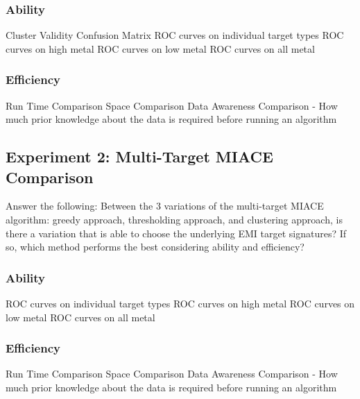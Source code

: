 \subsubsection{Ability}
Cluster Validity\newline
Confusion Matrix\newline
ROC curves on individual target types\newline
ROC curves on high metal \newline
ROC curves on low metal\newline
ROC curves on all metal

\subsubsection{Efficiency}
Run Time Comparison \newline
Space Comparison \newline
Data Awareness Comparison - How much prior knowledge about the data is required before running an algorithm\newline



\subsection{Experiment 2: Multi-Target MIACE Comparison}
Answer the following: Between the 3 variations of the multi-target MIACE algorithm: greedy approach, thresholding approach, and clustering approach, is there a variation that is able to choose the underlying EMI target signatures? If so, which method performs the best considering ability and efficiency?

\subsubsection{Ability}
ROC curves on individual target types\newline
ROC curves on high metal \newline
ROC curves on low metal\newline
ROC curves on all metal

\subsubsection{Efficiency}
Run Time Comparison \newline
Space Comparison \newline
Data Awareness Comparison - How much prior knowledge about the data is required before running an algorithm\newline



